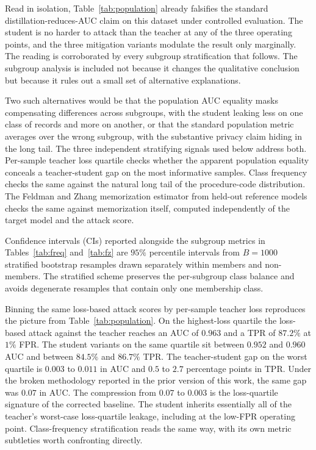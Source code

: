 \documentclass[conference]{IEEEtran}
\begin{document}
Read in isolation, Table~\ref{tab:population} already falsifies the standard distillation-reduces-AUC claim on this dataset under controlled evaluation. The student is no harder to attack than the teacher at any of the three operating points, and the three mitigation variants modulate the result only marginally. The reading is corroborated by every subgroup stratification that follows. The subgroup analysis is included not because it changes the qualitative conclusion but because it rules out a small set of alternative explanations.

Two such alternatives would be that the population AUC equality masks compensating differences across subgroups, with the student leaking less on one class of records and more on another, or that the standard population metric averages over the wrong subgroup, with the substantive privacy claim hiding in the long tail. The three independent stratifying signals used below address both. Per-sample teacher loss quartile checks whether the apparent population equality conceals a teacher-student gap on the most informative samples. Class frequency checks the same against the natural long tail of the procedure-code distribution. The Feldman and Zhang memorization estimator from held-out reference models~\cite{feldman2020} checks the same against memorization itself, computed independently of the target model and the attack score.

Confidence intervals (CIs) reported alongside the subgroup metrics in Tables~\ref{tab:freq} and~\ref{tab:fz} are $95\%$ percentile intervals from $B = 1000$ stratified bootstrap resamples drawn separately within members and non-members. The stratified scheme preserves the per-subgroup class balance and avoids degenerate resamples that contain only one membership class.

Binning the same loss-based attack scores by per-sample teacher loss reproduces the picture from Table~\ref{tab:population}. On the highest-loss quartile the loss-based attack against the teacher reaches an AUC of $0.963$ and a TPR of $87.2\%$ at $1\%$ FPR. The student variants on the same quartile sit between $0.952$ and $0.960$ AUC and between $84.5\%$ and $86.7\%$ TPR. The teacher-student gap on the worst quartile is $0.003$ to $0.011$ in AUC and $0.5$ to $2.7$ percentage points in TPR. Under the broken methodology reported in the prior version of this work, the same gap was $0.07$ in AUC. The compression from $0.07$ to $0.003$ is the loss-quartile signature of the corrected baseline. The student inherits essentially all of the teacher's worst-case loss-quartile leakage, including at the low-FPR operating point. Class-frequency stratification reads the same way, with its own metric subtleties worth confronting directly.
\end{document}
